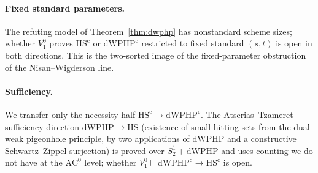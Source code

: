 \documentclass[11pt]{article}
\theoremstyle{definition}
\theoremstyle{remark}
\newcommand{\Vone}{V^0_1}
\newcommand{\HScert}{\mathrm{HS}^{\mathrm{c}}}
\newcommand{\dWPHPcert}{\mathrm{dWPHP}^{\mathrm{c}}}
\begin{document}
\paragraph{Fixed standard parameters.} The refuting model of
Theorem~\ref{thm:dwphp} has nonstandard scheme sizes; whether $\Vone$ proves
$\HScert$ or $\dWPHPcert$ restricted to fixed standard $(s,t)$ is open in both
directions. This is the two-sorted image of the fixed-parameter obstruction of
the Nisan--Wigderson line.

\paragraph{Sufficiency.} We transfer only the necessity half
$\HScert\to\dWPHPcert$. The Atserias--Tzameret sufficiency direction
$\mathrm{dWPHP}\to\mathrm{HS}$ (existence of small hitting sets from the dual
weak pigeonhole principle, by two applications of $\mathrm{dWPHP}$ and a
constructive Schwartz--Zippel surjection) is proved over $S^1_2+\mathrm{dWPHP}$
and uses counting we do not have at the $\mathrm{AC}^0$ level; whether
$\Vone\vdash\dWPHPcert\to\HScert$ is open.



\end{document}
